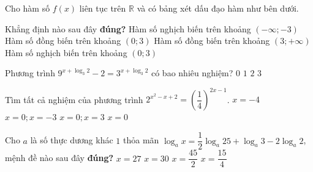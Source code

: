 \begin{ex}%
	Cho hàm số $f(x)$ liên tục trên $\mathbb{R}$ và có bảng xét dấu đạo hàm như bên dưới.
	\begin{center}
	\end{center}
	Khẳng định nào sau đây \textbf{đúng?}
	\choice
	{Hàm số nghịch biến trên khoảng $(-\infty;-3)$}
	{\True Hàm số đồng biến trên khoảng $(0;3)$}
	{Hàm số đồng biến trên khoảng $(3;+\infty)$}
	{Hàm số nghịch biến trên khoảng $(0;3)$}
\end{ex}

\begin{ex}%
	Phương trình $9^{x+\log_3 2}-2=3^{x+\log_3 2}$ có bao nhiêu nghiệm?
	\choice
	{$0$}
	{\True $1$}
	{$2$}
	{$3$}
\end{ex}

\begin{ex}%
	Tìm tất cả nghiệm của phương trình $2^{x^2-x+2}=\left(\dfrac{1}{4}\right)^{2x-1}$.
	\choice
	{$x=-4$}
	{\True $x=0;x=-3$}
	{$x=0;x=3$}
	{$x=0$}
\end{ex}

\begin{ex}%
	Cho $a$ là số thực dương khác $1$ thỏa mãn $\log_a x=\dfrac{1}{2}\log_a 25 +\log_a 3 -2\log_a 2$, mệnh đề nào sau đây \textbf{đúng?} 
	\choice
	{$x=27$}
	{$x=30$}
	{$x=\dfrac{45}{2}$}
	{\True $x=\dfrac{15}{4}$}
\end{ex}

